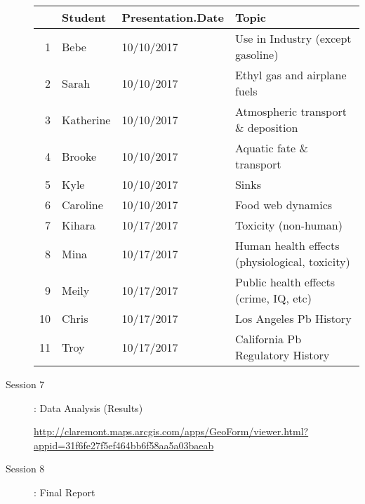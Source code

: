 \documentclass{article}\usepackage[]{graphicx}\usepackage[]{color}
\begin{document}
\begin{description}
\begin{table}[ht]
\centering
\begin{tabular}{rlll}
  \hline
 & Student & Presentation.Date & Topic \\ 
  \hline
1 & Bebe & 10/10/2017 & Use in Industry (except gasoline) \\ 
  2 & Sarah & 10/10/2017 & Ethyl gas and airplane fuels \\ 
  3 & Katherine & 10/10/2017 & Atmospheric transport \& deposition \\ 
  4 & Brooke & 10/10/2017 & Aquatic fate \& transport \\ 
  5 & Kyle & 10/10/2017 & Sinks \\ 
  6 & Caroline & 10/10/2017 & Food web dynamics \\ 
  7 & Kihara & 10/17/2017 & Toxicity (non-human) \\ 
  8 & Mina & 10/17/2017 & Human health effects (physiological, toxicity) \\ 
  9 & Meily & 10/17/2017 & Public health effects (crime, IQ, etc) \\ 
  10 & Chris & 10/17/2017 & Los Angeles Pb History \\ 
  11 & Troy & 10/17/2017 & California Pb Regulatory History \\ 
   \hline
\end{tabular}
\end{table}



  \item[Session 7]: Data Analysis (Results)

\url{http://claremont.maps.arcgis.com/apps/GeoForm/viewer.html?appid=31f6fe27f5ef464bb6f58aa5a03baeab}

\item[Session 8]: Final Report

\end{description}
\end{document}
